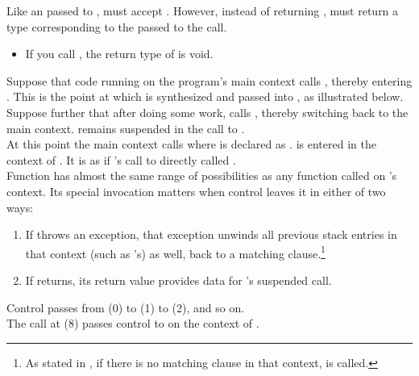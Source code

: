 Like an \entryfn passed to \callcc,  must accept
. However, instead of returning \cont,  must
return a type corresponding to the  passed to the \resumewith call.

\begin{itemize}
    \item If you call , the return type of 
          is void.
\end{itemize}

Suppose that code running on the program's main context calls ,
thereby entering . This is the point at which  is synthesized
and passed into , as illustrated below.\\

Suppose further that after doing some work,  calls ,
thereby switching back to the main context.  remains suspended
in the call to .\\

At this point the main context calls 
where  is declared as .  is
entered in the context of . It is as if 's call
to  directly called .\\

Function  has almost the same range of possibilities as any function
called on 's context. Its special invocation matters when control
leaves it in either of two ways:

\begin{enumerate}
  \item If  throws an exception, that exception unwinds all previous
        stack entries in that context (such as 's) as well, back to a
        matching  clause.\footnote{As stated in
        , if there is no matching  clause
        in that context,  is called.}
  \item If  returns, its return value provides data for 's
        suspended  call.
\end{enumerate}


Control passes from (0) to (1) to (2), and so on.\\

The  call at (8) passes control
to  on the context of .\\

